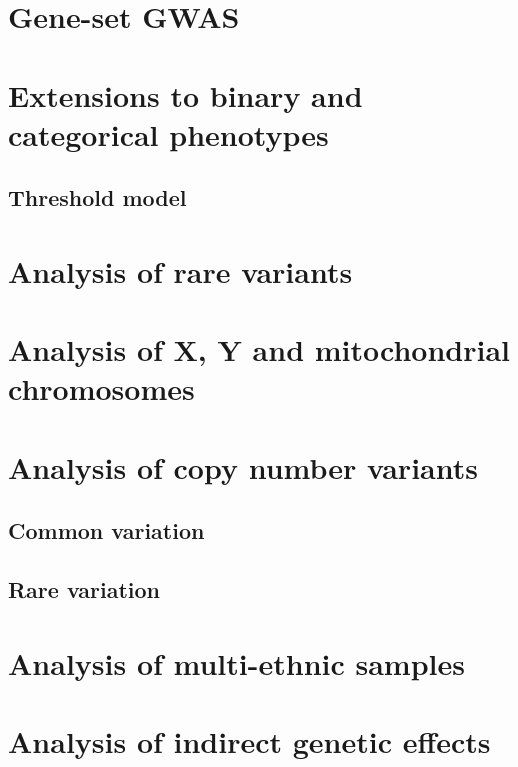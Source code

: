 \documentclass[]{book}
\theoremstyle{definition}
\theoremstyle{definition}
\theoremstyle{definition}
\theoremstyle{remark}
\begin{document}
\section{Gene-set GWAS}\label{gene-set-gwas}

\section{Extensions to binary and categorical
phenotypes}\label{extensions-to-binary-and-categorical-phenotypes}

\subsection{Threshold model}\label{threshold-model}

\section{Analysis of rare variants}\label{analysis-of-rare-variants}

\section{Analysis of X, Y and mitochondrial
chromosomes}\label{analysis-of-x-y-and-mitochondrial-chromosomes}

\section{Analysis of copy number
variants}\label{analysis-of-copy-number-variants}

\subsection{Common variation}\label{common-variation}

\subsection{Rare variation}\label{rare-variation}

\section{Analysis of multi-ethnic
samples}\label{analysis-of-multi-ethnic-samples}

\section{Analysis of indirect genetic
effects}\label{analysis-of-indirect-genetic-effects}
\end{document}
